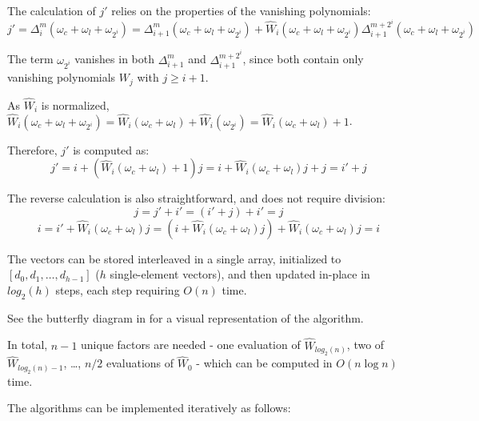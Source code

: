 The calculation of $j'$ relies on the properties of the vanishing polynomials: \[j' = \Delta_i^{m}(\omega_c + \omega_l + \omega_{2^i}) = \Delta_{i+1}^m(\omega_c + \omega_l + \omega_{2^i}) + \hat{W}_i(\omega_c + \omega_l + \omega_{2^i}) \Delta_{i+1}^{m + 2^i}(\omega_c + \omega_l + \omega_{2^i})\]

The term $\omega_{2^i}$ vanishes in both $\Delta_{i+1}^m$ and $\Delta_{i+1}^{m + 2^i}$, since both contain only vanishing polynomials $W_j$ with $j \geq i + 1$.

As $\hat{W}_i$ is normalized, $\hat{W}_i(\omega_c + \omega_l + \omega_{2^i}) = \hat{W}_i(\omega_c + \omega_l) + \hat{W}_i(\omega_{2^i}) = \hat{W}_i(\omega_c + \omega_l) + 1$.

Therefore, $j'$ is computed as: \[j' = i + (\hat{W}_i(\omega_c + \omega_l) + 1) j = i + \hat{W}_i(\omega_c + \omega_l) j + j = i' + j\]

The reverse calculation is also straightforward, and does not require division: \[j = j' + i' = (i' + j) + i' = j\] \[i = i' + \hat{W}_i(\omega_c + \omega_l) j = (i + \hat{W}_i(\omega_c + \omega_l) j) + \hat{W}_i(\omega_c + \omega_l) j = i\]

The vectors can be stored interleaved in a single array, initialized to $[d_0, d_1, \ldots, d_{h - 1}]$ ($h$ single-element vectors), and then updated in-place in $log_2(h)$ steps, each step requiring $O(n)$ time.

See the butterfly diagram in \cite{novel-poly} for a visual representation of the algorithm.

In total, $n - 1$ unique factors are needed - one evaluation of $\hat{W}_{log_2(n)}$, two of $\hat{W}_{log_2(n) - 1}$, \ldots, $n/2$ evaluations of $\hat{W}_0$ - which can be computed in $O(n \log n)$ time.

The algorithms can be implemented iteratively as follows:

